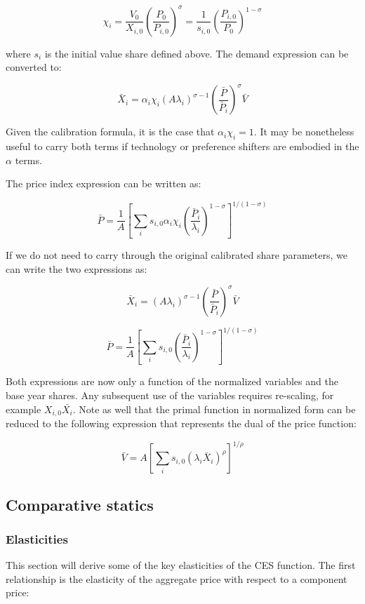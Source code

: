 \[
\chi_i = \frac{V_0}{X_{i,0}} \left(\frac{P_0}{P_{i,0}} \right)^{\sigma}
= \frac{1}{s_{i,0}} \left(\frac{P_{i,0}}{P_0} \right)^{1-\sigma}
\]

\noindent where $s_i$ is the initial value share defined above. The demand expression can be converted to:

\[
\bar{X}_i = {\alpha_i}{\chi_i}
{\left( A \lambda_i \right)}^{\sigma-1}
{\left( \frac{\bar{P}} {\bar{P}_i } \right)}^{\sigma} \bar{V}
\]

\noindent Given the calibration formula, it is the case
that ${\alpha_i}{\chi_i} = 1$. It may be nonetheless useful
to carry both terms if technology or preference shifters are
embodied in the $\alpha$ terms.

The price index expression can be written as:

\[
\bar{P} = \frac{1}{A}
\left[ \sum_i{
s_{i,0} \alpha_i \chi_i
\left(\frac{\bar{P}_i}{\lambda_i} \right)^{1-\sigma}
}
\right]^{1/(1-\sigma)}
\]

\noindent If we do not need to carry through the original
calibrated share parameters, we can write the two expressions as:

\[
\bar{X}_i =
{\left( A \lambda_i \right)}^{\sigma-1}
{\left( \frac{\bar{P}} {\bar{P}_i } \right)}^{\sigma} \bar{V}
\]

\[
\bar{P} = \frac{1}{A}
\left[ \sum_i{
s_{i,0}
\left(\frac{\bar{P}_i}{\lambda_i} \right)^{1-\sigma}
}
\right]^{1/(1-\sigma)}
\]

\noindent Both expressions are now only a function of the normalized variables and the base year shares.
Any subsequent use of the variables requires re-scaling, for example
$X_{i,0} \bar{X_i}$. Note as well that the primal function in normalized
form can be reduced to the following expression that represents the
dual of the price function:

\[
\bar{V} = {A}
\left[ \sum_i{
s_{i,0}
\left({\lambda_i} {\bar{X}_i} \right)^{\rho}
}
\right]^{1/\rho}
\]



\subsection{Comparative statics}

\subsubsection{Elasticities}

This section will derive some of the key elasticities of the CES function. The first relationship
is the elasticity of the aggregate price with respect to a component price:

